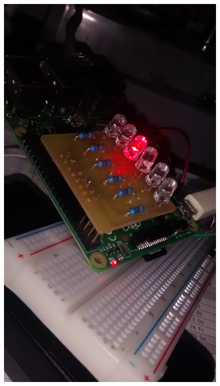\begin{figure}[H]
\includegraphics[height=0.255\textheight]{Chapters/Chapter5/Figures/estructuraFinal/pcb7}

\end{figure}
